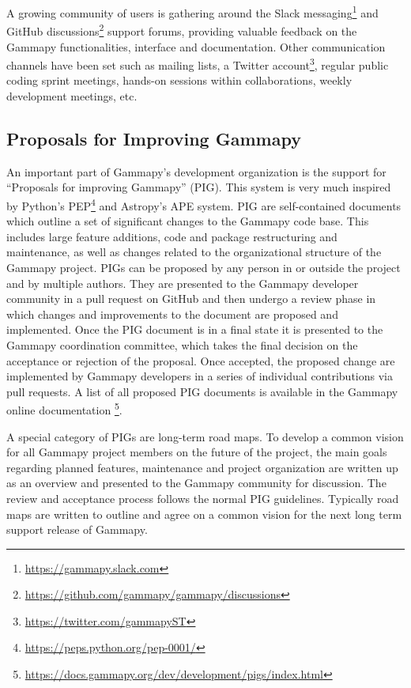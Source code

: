 \documentclass[longauth]{aa}
\newcommand{\gammapy}{Gammapy\xspace}
\newcommand{\github}{GitHub\xspace}
\begin{document}
A growing community of users is gathering around the Slack
messaging\footnote{\url{https://gammapy.slack.com}} and \github
discussions\footnote{\url{https://github.com/gammapy/gammapy/discussions}}
support forums, providing valuable feedback on the \gammapy functionalities,
interface and documentation. Other communication channels have been set such as
mailing lists, a Twitter account\footnote{\url{https://twitter.com/gammapyST}},
regular public coding sprint meetings, hands-on sessions within collaborations,
weekly development meetings, etc.

\subsection{Proposals for Improving \gammapy}
\label{ssec:pigs}
An important part of \gammapy's development organization is the support
for \enquote{Proposals for improving \gammapy} (PIG). This system is very much
inspired by Python's PEP\footnote{\url{https://peps.python.org/pep-0001/}}
and Astropy's APE \citep{greenfield_perry_2013} system.
PIG are self-contained documents which outline a set of significant
changes to the \gammapy code base. This includes large feature additions,
code and package restructuring and maintenance, as well as changes related
to the organizational structure of the \gammapy project. PIGs can be proposed
by any person in or outside the project and by multiple authors. They
are presented to the \gammapy developer community in a pull request
on \github and then undergo a review phase in which changes and
improvements to the document are proposed and implemented. Once the PIG
document is in a final state it is presented to the \gammapy
coordination committee, which takes the final decision on the
acceptance or rejection of the proposal. Once accepted, the proposed
change are implemented by \gammapy developers in a series of
individual contributions via pull requests. A list of all proposed
PIG documents is available in the \gammapy online documentation
\footnote{\url{https://docs.gammapy.org/dev/development/pigs/index.html}}.

A special category of PIGs are long-term {road maps}. To develop a common
vision for all \gammapy project members on the future of the
project, the main goals regarding planned features, maintenance and
project organization are written up as an overview and presented to the
\gammapy community for discussion. The review and acceptance process
follows the normal PIG guidelines. Typically road maps are written
to outline and agree on a common vision for the next long term
support release of \gammapy.
\end{document}
